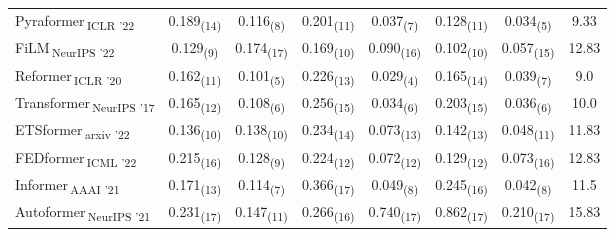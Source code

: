 \begin{table}[htbp]
\begin{tabular}{l|cccccc|c}
Pyraformer\,\textsubscript{ICLR '22} & 0.189\textsubscript{(14)} & 0.116\textsubscript{(8)} & 0.201\textsubscript{(11)} & 0.037\textsubscript{(7)} & 0.128\textsubscript{(11)} & 0.034\textsubscript{(5)} & 9.33 \\
FiLM\,\textsubscript{NeurIPS '22} & 0.129\textsubscript{(9)} & 0.174\textsubscript{(17)} & 0.169\textsubscript{(10)} & 0.090\textsubscript{(16)} & 0.102\textsubscript{(10)} & 0.057\textsubscript{(15)} & 12.83 \\
Reformer\,\textsubscript{ICLR '20} & 0.162\textsubscript{(11)} & 0.101\textsubscript{(5)} & 0.226\textsubscript{(13)} & 0.029\textsubscript{(4)} & 0.165\textsubscript{(14)} & 0.039\textsubscript{(7)} & 9.0 \\
Transformer\,\textsubscript{NeurIPS '17} & 0.165\textsubscript{(12)} & 0.108\textsubscript{(6)} & 0.256\textsubscript{(15)} & 0.034\textsubscript{(6)} & 0.203\textsubscript{(15)} & 0.036\textsubscript{(6)} & 10.0 \\
ETSformer\,\textsubscript{arxiv '22} & 0.136\textsubscript{(10)} & 0.138\textsubscript{(10)} & 0.234\textsubscript{(14)} & 0.073\textsubscript{(13)} & 0.142\textsubscript{(13)} & 0.048\textsubscript{(11)} & 11.83 \\
FEDformer\,\textsubscript{ICML '22} & 0.215\textsubscript{(16)} & 0.128\textsubscript{(9)} & 0.224\textsubscript{(12)} & 0.072\textsubscript{(12)} & 0.129\textsubscript{(12)} & 0.073\textsubscript{(16)} & 12.83 \\
Informer\,\textsubscript{AAAI '21} & 0.171\textsubscript{(13)} & 0.114\textsubscript{(7)} & 0.366\textsubscript{(17)} & 0.049\textsubscript{(8)} & 0.245\textsubscript{(16)} & 0.042\textsubscript{(8)} & 11.5 \\
Autoformer\,\textsubscript{NeurIPS '21} & 0.231\textsubscript{(17)} & 0.147\textsubscript{(11)} & 0.266\textsubscript{(16)} & 0.740\textsubscript{(17)} & 0.862\textsubscript{(17)} & 0.210\textsubscript{(17)} & 15.83 \\
\bottomrule
\end{tabular}
\end{table}
